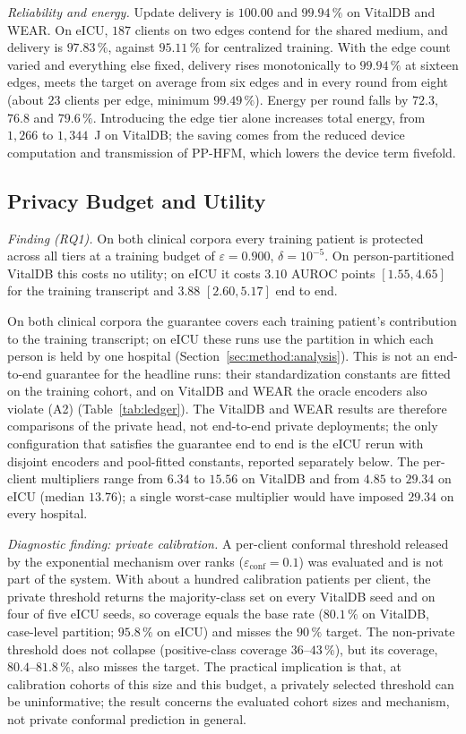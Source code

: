 \emph{Reliability and energy.} Update delivery is $100.00$ and $99.94\,\%$ on
VitalDB and WEAR. On eICU, $187$ clients on two edges contend for the shared
medium, and delivery is $97.83\,\%$, against $95.11\,\%$ for centralized
training. With the edge count varied and everything else fixed, delivery
rises monotonically to $99.94\,\%$ at sixteen edges, meets the target on
average from six edges and in every round from eight (about $23$ clients per
edge, minimum $99.49\,\%$). Energy per round falls by $72.3$, $76.8$ and
$79.6\,\%$. Introducing the edge tier alone increases total energy, from
$1{,}266$ to $1{,}344$~J on VitalDB; the saving comes from the reduced device
computation and transmission of PP-HFM, which lowers the device term
fivefold.

\subsection{Privacy Budget and Utility}
\label{sec:results:privacy}
\emph{Finding (RQ1).} On both clinical corpora every training patient is
protected across all tiers at a training budget of $\varepsilon = 0.900$, $\delta = 10^{-5}$. On
person-partitioned VitalDB this costs no utility; on eICU it costs $3.10$
AUROC points $[1.55, 4.65]$ for the training transcript and $3.88$
$[2.60, 5.17]$ end to end.

On both clinical corpora the guarantee covers each training patient's
contribution to the training transcript; on eICU these runs
use the partition in which each person is held by one hospital
(Section~\ref{sec:method:analysis}). This is not an end-to-end guarantee for
the headline runs: their standardization constants are fitted on the
training cohort, and on VitalDB and WEAR the oracle encoders also violate
(A2) (Table~\ref{tab:ledger}). The VitalDB and WEAR results are therefore
comparisons of the private head, not end-to-end private deployments; the
only configuration that satisfies the guarantee end to end is the eICU rerun with disjoint encoders and pool-fitted constants, reported separately below. The per-client
multipliers range from $6.34$ to $15.56$ on VitalDB and from $4.85$ to
$29.34$ on eICU (median $13.76$); a single worst-case multiplier would have
imposed $29.34$ on every hospital.

\emph{Diagnostic finding: private calibration.} A per-client conformal threshold
released by the exponential mechanism over ranks \cite{ref30, ref24}
($\varepsilon_{\mathrm{conf}} = 0.1$) was evaluated and is not part of the
system. With about a hundred calibration patients per client, the private
threshold returns the majority-class set on every VitalDB seed and on four of
five eICU seeds, so coverage equals the base rate ($80.1\,\%$ on VitalDB,
case-level partition; $95.8\,\%$ on eICU) and misses the $90\,\%$ target.
The non-private threshold does not collapse (positive-class coverage
$36$--$43\,\%$), but its coverage, $80.4$--$81.8\,\%$, also misses the
target. The practical implication is that, at calibration cohorts of this
size and this budget, a privately selected threshold can be uninformative;
the result concerns the evaluated cohort sizes and mechanism, not private
conformal prediction in general.

